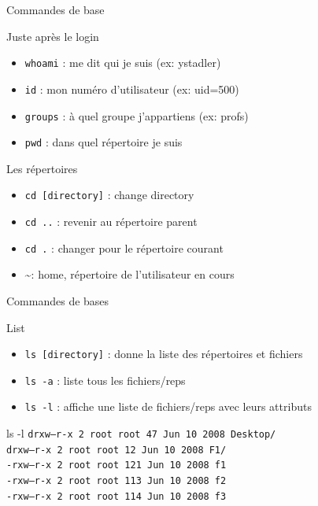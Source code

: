 \begin{frame}{Commandes de base}
\begin{block}{Juste après le login}
\begin{itemize}
\item \texttt{whoami} : me dit qui je suis (ex: ystadler)
\item \texttt{id} : mon numéro d'utilisateur (ex: uid=500)
\item \texttt{groups} : à quel groupe j'appartiens (ex: profs)
\item \texttt{pwd} : dans quel répertoire je suis
\end{itemize}
\end{block}

\begin{block}{Les répertoires}
\begin{itemize}
\item \texttt{cd [directory]} : change directory
\item \texttt{cd ..} : revenir au répertoire parent
\item \texttt{cd .} : changer pour le répertoire courant
\item \textasciitilde : home, répertoire de l'utilisateur en cours
\end{itemize}

\end{block}
\end{frame}


\begin{frame}{Commandes de bases}
\begin{block}{List}
\begin{itemize}
\item \texttt{ls [directory]} : donne la liste des répertoires et fichiers
\item \texttt{ls -a} : liste tous les fichiers/reps
\item \texttt{ls -l} : affiche une liste de fichiers/reps avec leurs attributs
\end{itemize}
\end{block}

\begin{block}{ls -l}
\texttt{drxw---r-x 2 root root 47  Jun 10 2008 Desktop/ \\
drxw---r-x 2 root root 12  Jun 10 2008 F1/ \\
-rxw---r-x 2 root root 121 Jun 10 2008 f1 \\
-rxw---r-x 2 root root 113 Jun 10 2008 f2 \\
-rxw---r-x 2 root root 114 Jun 10 2008 f3
}
\end{block}
\end{frame}


